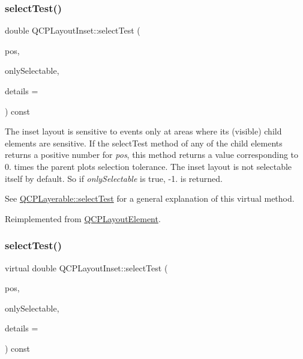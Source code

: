 \subsubsection{\texorpdfstring{select\+Test()}{selectTest()}\hspace{0.1cm}{\footnotesize\ttfamily [1/2]}}
{\footnotesize\ttfamily double Q\+C\+P\+Layout\+Inset\+::select\+Test (\begin{DoxyParamCaption}\item[{const Q\+PointF \&}]{pos,  }\item[{bool}]{only\+Selectable,  }\item[{Q\+Variant $\ast$}]{details = {} }\end{DoxyParamCaption}) const\hspace{0.3cm}{\ttfamily [virtual]}}

The inset layout is sensitive to events only at areas where its (visible) child elements are sensitive. If the select\+Test method of any of the child elements returns a positive number for {\itshape pos}, this method returns a value corresponding to 0. times the parent plot\textquotesingle{}s selection tolerance. The inset layout is not selectable itself by default. So if {\itshape only\+Selectable} is true, -\/1. is returned.

See \hyperlink{class_q_c_p_layerable_a04db8351fefd44cfdb77958e75c6288e}{Q\+C\+P\+Layerable\+::select\+Test} for a general explanation of this virtual method. 

Reimplemented from \hyperlink{class_q_c_p_layout_element_ae97f483cccedadbf18ea4525ef240ee4}{Q\+C\+P\+Layout\+Element}.

\mbox{\label{class_q_c_p_layout_inset_a4bd96dd77545a2b407d24c8bdc276927}} 
\subsubsection{\texorpdfstring{select\+Test()}{selectTest()}\hspace{0.1cm}{\footnotesize\ttfamily [2/2]}}
{\footnotesize\ttfamily virtual double Q\+C\+P\+Layout\+Inset\+::select\+Test (\begin{DoxyParamCaption}\item[{const Q\+PointF \&}]{pos,  }\item[{bool}]{only\+Selectable,  }\item[{Q\+Variant $\ast$}]{details = {} }\end{DoxyParamCaption}) const\hspace{0.3cm}{\ttfamily [virtual]}}

